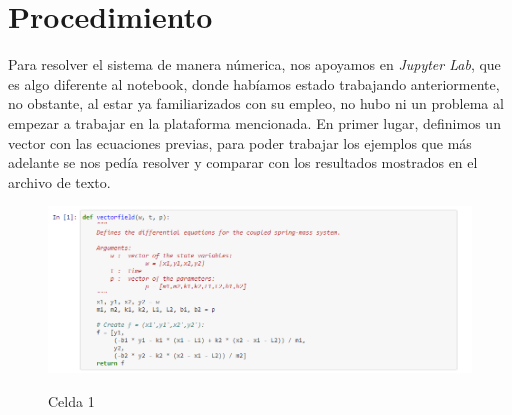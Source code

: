 \documentclass{article}
\begin{document}
\section{Procedimiento}
Para resolver el sistema de manera númerica, nos apoyamos en \textit{Jupyter Lab}, que es algo diferente al notebook, donde habíamos estado trabajando anteriormente, no obstante, al estar ya familiarizados con su empleo, no hubo ni un problema al empezar a trabajar en la plataforma mencionada.
En primer lugar, definimos un vector con las ecuaciones previas, para poder trabajar los ejemplos que más adelante se nos pedía resolver y comparar con los resultados mostrados en el archivo de texto.
\begin{figure}[H]
    \caption{Celda 1}
    \includegraphics[width=1\textwidth]{Celda1.PNG}
    \centering
    \label{Cod}
\end{figure}
\end{document}
